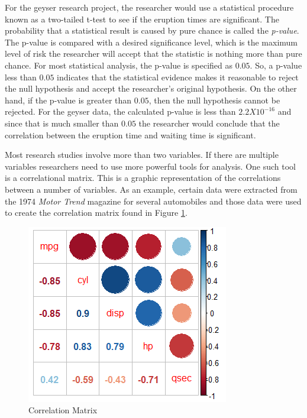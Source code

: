 For the geyser research project, the researcher would use a statistical procedure known as a two-tailed t-test to see if the eruption times are significant. The probability that a statistical result is caused by pure chance is called the \textit{p-value}. The p-value is compared with a desired significance level, which is the maximum level of risk the researcher will accept that the statistic is nothing more than pure chance. For most statistical analysis, the p-value is specified as $ 0.05 $. So, a p-value less than $ 0.05 $ indicates that the statistical evidence makes it reasonable to reject the null hypothesis and accept the researcher's original hypothesis. On the other hand, if the p-value is greater than $ 0.05 $, then the null hypothesis cannot be rejected. For the geyser data, the calculated p-value is less than $ 2.2 X 10^{-16} $ and since that is much smaller than $ 0.05 $ the researcher would conclude that the correlation between the eruption time and waiting time is significant.

Most research studies involve more than two variables. If there are multiple variables researchers need to use more powerful tools for analysis. One such tool is a correlational matrix. This is a graphic representation of the correlations between a number of variables. As an example, certain data were extracted from the 1974 \textit{Motor Trend} magazine for several automobiles and those data were used to create the correlation matrix found in Figure \ref{14:fig07}.

\begin{figure}[H]
	\centering
	\includegraphics[width=\maxwidth{.95\linewidth}]{gfx/14_corplot}
	\caption{Correlation Matrix}
	\label{14:fig07}
\end{figure}

